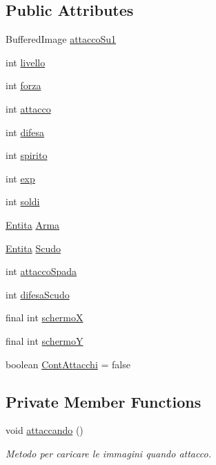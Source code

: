 \subsection*{Public Attributes}
\begin{DoxyCompactItemize}
\item 
Buffered\+Image \hyperlink{class_entita_1_1_giocatore_a738b89ee909e3e3b2751a2fa9a959813}{attacco\+Su1}
\item 
int \hyperlink{class_entita_1_1_giocatore_a9df9739330535dcec4121b7a25289af6}{livello}
\item 
int \hyperlink{class_entita_1_1_giocatore_a11a8dccab7cd0e8facbe3152140e41b8}{forza}
\item 
int \hyperlink{class_entita_1_1_giocatore_a585c716c79ac39d627dd9719b902a64f}{attacco}
\item 
int \hyperlink{class_entita_1_1_giocatore_afdf43c12f58b193223e199b997834e59}{difesa}
\item 
int \hyperlink{class_entita_1_1_giocatore_a531fc785df2ee9bd58da74a801e766c4}{spirito}
\item 
int \hyperlink{class_entita_1_1_giocatore_a3bb4af16b31e7979f424cf66f1bfa6e2}{exp}
\item 
int \hyperlink{class_entita_1_1_giocatore_a4ab2b490b2927b4d21ee663f63f81bd6}{soldi}
\item 
\hyperlink{class_entita_1_1_entita}{Entita} \hyperlink{class_entita_1_1_giocatore_ade56944373ebbc5f5117b39639e3cef5}{Arma}
\item 
\hyperlink{class_entita_1_1_entita}{Entita} \hyperlink{class_entita_1_1_giocatore_a07e5f7f5db8ac85356757f54f153bb20}{Scudo}
\item 
int \hyperlink{class_entita_1_1_giocatore_a955d461d95cf97cd1806f6abc44ce485}{attacco\+Spada}
\item 
int \hyperlink{class_entita_1_1_giocatore_ad1c7c7fe90e4e2563cac9ed38ccb479d}{difesa\+Scudo}
\item 
final int \hyperlink{class_entita_1_1_giocatore_a446b75d761c1ca3d631eaa61b04298d2}{schermoX}
\item 
final int \hyperlink{class_entita_1_1_giocatore_ada8f80a3f9f6b62953b85f6d05d02c50}{schermoY}
\item 
boolean \hyperlink{class_entita_1_1_giocatore_a0ace2881b0b5e4e097b5f406cb9d173b}{Cont\+Attacchi} = false
\end{DoxyCompactItemize}
\subsection*{Private Member Functions}
\begin{DoxyCompactItemize}
\item 
void \hyperlink{class_entita_1_1_giocatore_af4bcd86c7ccc1775a5fece50849563fe}{attaccando} ()
\begin{DoxyCompactList}\small\item\em Metodo per caricare le immagini quando attacco. \end{DoxyCompactList}\end{DoxyCompactItemize}


